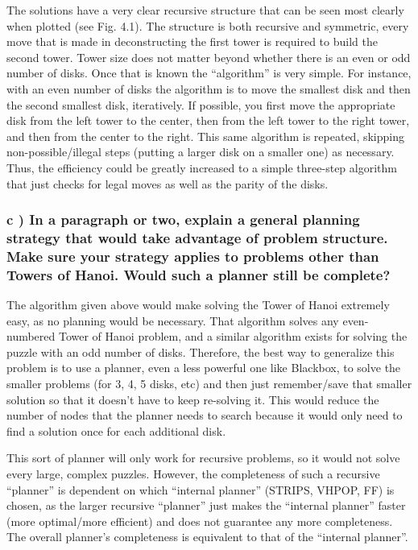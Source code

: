 \documentclass{article}
\begin{document}
    The solutions have a very clear recursive structure that can be seen
most clearly when plotted (see Fig. 4.1). The structure is both
recursive and symmetric, every move that is made in deconstructing the
first tower is required to build the second tower. Tower size does not
matter beyond whether there is an even or odd number of disks. Once that
is known the ``algorithm'' is very simple. For instance, with an even
number of disks the algorithm is to move the smallest disk and then the
second smallest disk, iteratively. If possible, you first move the
appropriate disk from the left tower to the center, then from the left
tower to the right tower, and then from the center to the right. This
same algorithm is repeated, skipping non-possible/illegal steps (putting
a larger disk on a smaller one) as necessary. Thus, the efficiency could
be greatly increased to a simple three-step algorithm that just checks
for legal moves as well as the parity of the disks.


    \subsubsection{c ) In a paragraph or two, explain a general planning strategy that
would take advantage of problem structure. Make sure your strategy
applies to problems other than Towers of Hanoi. Would such a planner
still be complete?}


    The algorithm given above would make solving the Tower of Hanoi
extremely easy, as no planning would be necessary. That algorithm solves
any even-numbered Tower of Hanoi problem, and a similar algorithm exists
for solving the puzzle with an odd number of disks. Therefore, the best
way to generalize this problem is to use a planner, even a less powerful
one like Blackbox, to solve the smaller problems (for 3, 4, 5 disks,
etc) and then just remember/save that smaller solution so that it
doesn't have to keep re-solving it. This would reduce the number of
nodes that the planner needs to search because it would only need to
find a solution once for each additional disk.

This sort of planner will only work for recursive problems, so it would
not solve every large, complex puzzles. However, the completeness of
such a recursive ``planner'' is dependent on which ``internal planner''
(STRIPS, VHPOP, FF) is chosen, as the larger recursive ``planner'' just
makes the ``internal planner'' faster (more optimal/more efficient) and
does not guarantee any more completeness. The overall planner's
completeness is equivalent to that of the ``internal planner''.
\end{document}
